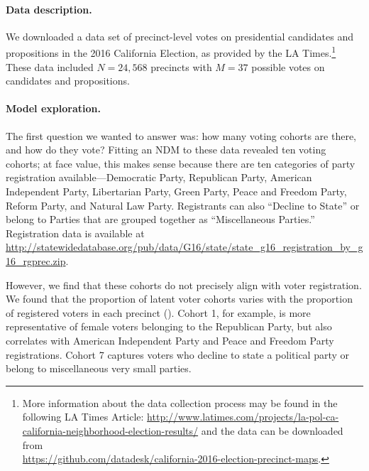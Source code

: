 \documentclass[twoside,11pt]{article}
\begin{document}
\paragraph{Data description.}
We downloaded a data set of precinct-level votes on presidential candidates and propositions in the 2016 California Election, as provided by the LA Times.\footnote{More information about the data collection process may be found in the following LA Times Article: \url{http://www.latimes.com/projects/la-pol-ca-california-neighborhood-election-results/} and the data can be downloaded from\\ \url{https://github.com/datadesk/california-2016-election-precinct-maps}.}  These data included $N=24,568$ precincts with $M=37$ possible votes on candidates and propositions.


\paragraph{Model exploration.}
The first question we wanted to answer was: how many voting cohorts are there, and how do they vote?
Fitting an NDM to these data revealed ten voting cohorts; at face value, this makes sense because there are ten categories of party registration available---Democratic Party, Republican Party, American Independent Party, Libertarian Party, Green Party, Peace and Freedom Party, Reform Party, and Natural Law Party.
Registrants can also ``Decline to State'' or belong to Parties that are grouped together as ``Miscellaneous Parties.'' Registration data is available at \url{http://statewidedatabase.org/pub/data/G16/state/state_g16_registration_by_g16_rgprec.zip}.

However, we find that these cohorts do not precisely align with voter registration.  We found that the proportion of latent voter cohorts varies with the proportion of registered voters in each precinct ().  Cohort 1, for example, is more representative of female voters belonging to the Republican Party, but also correlates with American Independent Party and Peace and Freedom Party registrations.  Cohort 7 captures voters who decline to state a political party or belong to miscellaneous very small parties.
\end{document}
